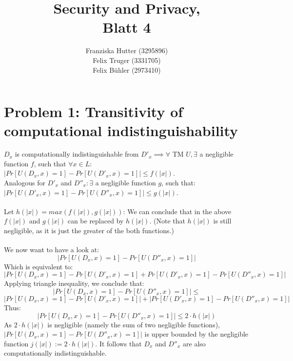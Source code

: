 \documentclass[12pt,pdftex,a4paper]{article}
\title{Security and Privacy,\\ Blatt 4}
\author{Franziska Hutter (3295896)\\
	Felix Truger (3331705)\\
	Felix Bühler (2973410)}
\begin{document}
\maketitle
\pagebreak

\section*{Problem 1: Transitivity of computational indistinguishability}


$D_x$ is computationally indistinguishable from $D'_x \implies \forall$ TM $U, \exists$ a negligible function $f$, such that $\forall x\in L:$\\$|Pr[U(D_x, x)=1]-Pr[U(D'_x, x)=1]|\leq f(|x|)$.\\
Analogous for $D'_x$ and $D''_x: \exists$ a negligible function $g$, such that:\\
$|Pr[U(D'_x, x)=1]-Pr[U(D''_x, x)=1]|\leq g(|x|)$.\\~\\
Let $h(|x|)=max(f(|x|), g(|x|))$: We can conclude that in the above $f(|x|)$ and $g(|x|)$ can be replaced by $h(|x|)$. (Note that $h(|x|)$ is still negligible, as it is just the greater of the both functions.)
\\~\\
We now want to have a look at:
$$|Pr[U(D_x, x)=1]-Pr[U(D''_x, x)=1]|$$
Which is equivalent to:
$$|Pr[U(D_x, x)=1]-Pr[U(D'_x, x)=1] + Pr[U(D'_x, x)=1]-Pr[U(D''_x, x)=1]|$$
Applying triangle inequality, we conclude that:
$$|Pr[U(D_x, x)=1]-Pr[U(D''_x, x)=1]|\leq$$ $$|Pr[U(D_x, x)=1]-Pr[U(D'_x, x)=1]| + |Pr[U(D'_x, x)=1]-Pr[U(D''_x, x)=1]|$$
Thus:
$$|Pr[U(D_x, x)=1]-Pr[U(D''_x, x)=1]| \leq 2\cdot h(|x|)$$
As $2\cdot h(|x|)$ is negligible (namely the sum of two negligible functions), $|Pr[U(D_x, x)=1]-Pr[U(D''_x, x)=1]|$ is upper bounded by the negligible function $j(|x|):=2\cdot h(|x|)$. It follows that $D_x$ and $D''_x$ are also computationally indistinguishable.
\end{document}
